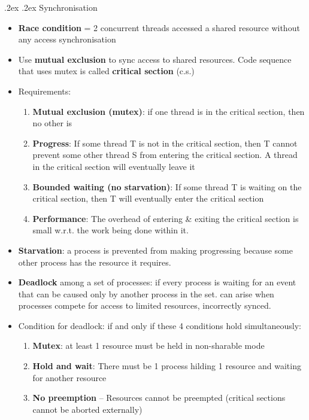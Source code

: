 \documentclass[10pt,landscape,a4paper]{article}
\makeatletter
\renewcommand{\subsection}{\@startsection{subsection}{1}{0mm}%
  {.2ex}%
  {.2ex}%
{\sffamily\bfseries}}
\makeatother
\begin{document}
\begin{multicols*}{4}
  \subsection{Synchronisation}
  \begin{itemize}
    \item \textbf{Race condition} = 2 concurrent threads accessed a shared resource without any access synchronisation
    \item Use \textbf{mutual exclusion} to sync access to shared resources. Code sequence that uses mutex is called \textbf{critical section} (c.s.)
    \item Requirements:
          \begin{enumerate}
            \item \textbf{Mutual exclusion (mutex)}: if one thread is in the critical section, then no other is
            \item \textbf{Progress}: If some thread T is not in the critical section, then T cannot prevent some other thread S from entering the critical section. A thread in the critical section will eventually leave it
            \item \textbf{Bounded waiting (no starvation)}: If some thread T is waiting on the critical section, then T will eventually enter the critical section
            \item \textbf{Performance}: The overhead of entering \& exiting the critical section is small w.r.t. the work being done within it.
          \end{enumerate}
    \item \textbf{Starvation}: a process is prevented from making progressing because some other process has the resource it requires.
    \item \textbf{Deadlock} among a set of processes: if every process is waiting for an event that can be caused only by another process in the set. can arise when processes compete for access to limited resources, incorrectly synced.
    \item Condition for deadlock: if and only if these 4 conditions hold simultaneously:
          \begin{enumerate}
            \item \textbf{Mutex}: at least 1 resource must be held in non-sharable mode
            \item \textbf{Hold and wait}: There must be 1 process hilding 1 resource and waiting for another resource
            \item \textbf{No preemption} -- Resources cannot be preempted (critical sections cannot be aborted externally)

\end{enumerate}
\end{itemize}
\end{multicols*}
\end{document}
